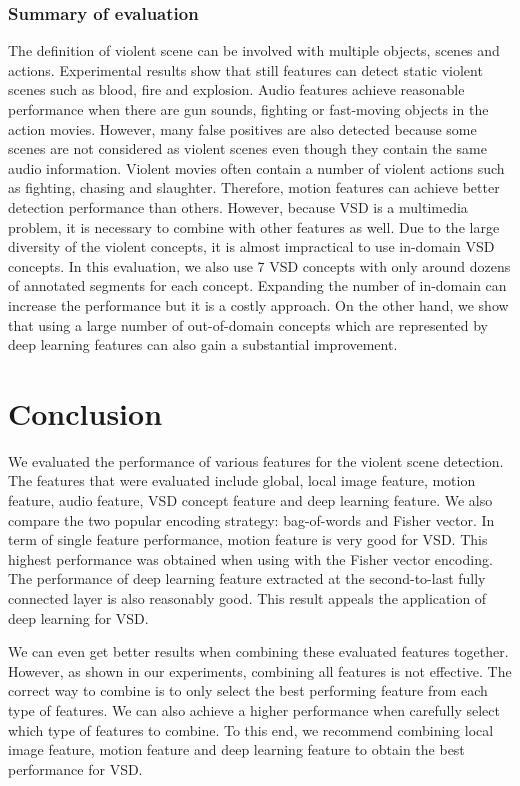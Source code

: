 \documentclass[twocolumn]{bmcart}%
\begin{document}
\subsubsection{Summary of evaluation}
The definition of violent scene can be involved with multiple objects, scenes and actions.  Experimental results show that still features can detect static violent scenes such as blood, fire and explosion. Audio features achieve reasonable performance when there are gun sounds, fighting or fast-moving objects in the action movies. However, many false positives are also detected because some scenes are not considered as violent scenes even though they contain the same audio information.  
Violent movies often contain a number of violent actions such as fighting, chasing and slaughter.  Therefore, motion features can achieve better detection performance than others. However, because VSD is a multimedia problem, it is necessary to combine with other features as well.
Due to the large diversity of the violent concepts, it is almost impractical to use in-domain VSD concepts.  In this evaluation, we also use 7 VSD concepts with only around dozens of annotated segments for each concept.  Expanding the number of in-domain can increase the performance but it is a costly approach.  On the other hand, we show that using a large number of out-of-domain concepts which are represented by deep learning features can also gain a substantial improvement.

\section{Conclusion}
We evaluated the performance of various features for the violent scene detection. The features that were evaluated include global, local image feature, motion feature, audio feature, VSD concept feature and deep learning feature. We also compare the two popular encoding strategy: bag-of-words and Fisher vector. In term of single feature performance, motion feature is very good for VSD. This highest performance was obtained when using with the Fisher vector encoding. The performance of deep learning feature extracted at the second-to-last fully connected layer is also reasonably good. This result appeals the application of deep learning for VSD.   

We can even get better results when combining these evaluated features together. However, as shown in our experiments, combining all features is not effective. The correct way to combine is to only select the best performing feature from each type of features. We can also achieve a higher performance when carefully select which type of features to combine. To this end, we recommend combining local image feature, motion feature and deep learning feature to obtain the best performance for VSD.
\end{document}
